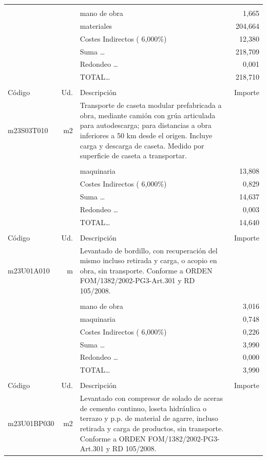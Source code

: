 \begin{supertabular}{l r p{60mm} r}
&&&\\%
&&mano de obra&     1,665\\%
&&materiales&   204,664\\%
&&Costes Indirectos (     6,000\%)&    12,380\\%
&&Suma \ldots&   218,709\\%
&&Redondeo \ldots&     0,001\\%
%
&&TOTAL\ldots&   218,710\\%
&&&\\%
Código&Ud.&Descripción&Importe\\%
\hline%
m23S03T010&m2&Transporte de caseta modular prefabricada a obra, mediante camión con grúa articulada para autodescarga; para distancias a obra inferiores a 50 km desde el origen. Incluye carga y descarga de caseta. Medido por superficie de caseta a transportar.&\\%
&&&\\%
&&maquinaria&    13,808\\%
&&Costes Indirectos (     6,000\%)&     0,829\\%
&&Suma \ldots&    14,637\\%
&&Redondeo \ldots&     0,003\\%
%
&&TOTAL\ldots&    14,640\\%
&&&\\%
Código&Ud.&Descripción&Importe\\%
\hline%
m23U01A010&m&Levantado de bordillo, con recuperación del mismo incluso retirada y carga, o acopio en obra, sin transporte. Conforme a ORDEN FOM/1382/2002{-}PG3{-}Art.301 y RD 105/2008.&\\%
&&&\\%
&&mano de obra&     3,016\\%
&&maquinaria&     0,748\\%
&&Costes Indirectos (     6,000\%)&     0,226\\%
&&Suma \ldots&     3,990\\%
&&Redondeo \ldots&     0,000\\%
%
&&TOTAL\ldots&     3,990\\%
&&&\\%
Código&Ud.&Descripción&Importe\\%
\hline%
m23U01BP030&m2&Levantado con compresor de solado de aceras de cemento continuo, loseta hidráulica o terrazo y p.p. de material de agarre, incluso retirada y carga de productos, sin transporte. Conforme a ORDEN FOM/1382/2002{-}PG3{-}Art.301 y RD 105/2008.&\\%

\end{supertabular}
